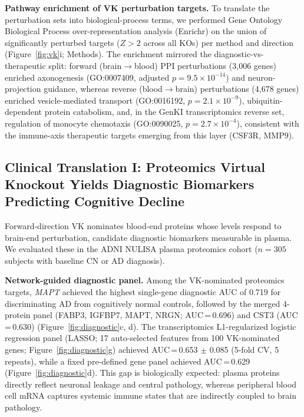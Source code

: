 \documentclass[12pt,a4paper]{article}
\begin{document}
\textbf{Pathway enrichment of VK perturbation targets.}
To translate the perturbation sets into biological-process terms, we performed Gene Ontology Biological Process over-representation analysis (Enrichr) on the union of significantly perturbed targets ($Z > 2$ across all KOs) per method and direction (Figure~\ref{fig:vk}i; Methods). The enrichment mirrored the diagnostic-vs-therapeutic split: forward (brain$\rightarrow$blood) PPI perturbations (3{,}006 genes) enriched axonogenesis (GO:0007409, adjusted $p = 9.5 \times 10^{-14}$) and neuron-projection guidance, whereas reverse (blood$\rightarrow$brain) perturbations (4{,}678 genes) enriched vesicle-mediated transport (GO:0016192, $p = 2.1 \times 10^{-9}$), ubiquitin-dependent protein catabolism, and, in the GenKI transcriptomics reverse set, regulation of monocyte chemotaxis (GO:0090025, $p = 2.7 \times 10^{-4}$), consistent with the immune-axis therapeutic targets emerging from this layer (CSF3R, MMP9).

\subsection{Clinical Translation I: Proteomics Virtual Knockout Yields Diagnostic Biomarkers Predicting Cognitive Decline}

Forward-direction VK nominates blood-end proteins whose levels respond to brain-end perturbation, candidate diagnostic biomarkers measurable in plasma. We evaluated these in the ADNI NULISA plasma proteomics cohort ($n = 305$ subjects with baseline CN or AD diagnosis).

\textbf{Network-guided diagnostic panel.}
Among the VK-nominated proteomics targets, \textit{MAPT} achieved the highest single-gene diagnostic AUC of 0.719 for discriminating AD from cognitively normal controls, followed by the merged 4-protein panel (FABP3, IGFBP7, MAPT, NRGN; AUC\,=\,0.696) and CST3 (AUC\,=\,0.630) (Figure~\ref{fig:diagnostic}c, d). The transcriptomics L1-regularized logistic regression panel (LASSO; 17 auto-selected features from 100 VK-nominated genes; Figure~\ref{fig:diagnostic}g) achieved AUC\,=\,0.653 $\pm$ 0.085 (5-fold CV, 5 repeats), while a fixed pre-defined gene panel achieved AUC\,=\,0.629 (Figure~\ref{fig:diagnostic}d). This gap is biologically expected: plasma proteins directly reflect neuronal leakage and central pathology, whereas peripheral blood cell mRNA captures systemic immune states that are indirectly coupled to brain pathology.
\end{document}
